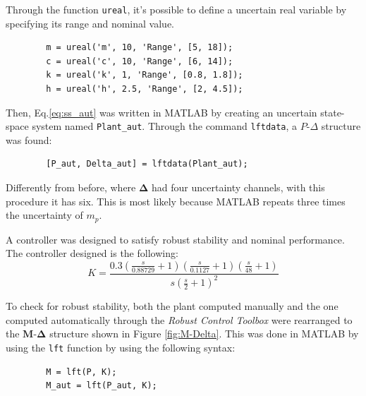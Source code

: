 \documentclass{scrreprt}
\begin{document}
Through the function \texttt{ureal}, it's possible to define a uncertain real variable by specifying its range and nominal value.

\begin{center}
    \begin{verbatim}
        m = ureal('m', 10, 'Range', [5, 18]);
        c = ureal('c', 10, 'Range', [6, 14]);
        k = ureal('k', 1, 'Range', [0.8, 1.8]);
        h = ureal('h', 2.5, 'Range', [2, 4.5]);
    \end{verbatim}
\end{center}

Then, Eq.\ref{eq:ss_aut} was written in MATLAB by creating an uncertain state-space system named \texttt{Plant\_aut}. Through the command \texttt{lftdata}, a $P$-$\Delta$ structure was found:

\begin{center}
    \begin{verbatim}
        [P_aut, Delta_aut] = lftdata(Plant_aut);
    \end{verbatim}
\end{center}

Differently from before, where $\boldsymbol{\Delta}$ had four uncertainty channels, with this procedure it has six. This is most likely because MATLAB repeats three times the uncertainty of $m_p$.

A controller was designed to satisfy robust stability and nominal performance. 
The controller designed is the following:
\begin{equation}
    K = \frac{0.3 \left( \frac{s}{0.88729} + 1 \right) \left( \frac{s}{0.1127} + 1 \right) \left( \frac{s}{48} + 1 \right)}{s \left( \frac{s}{2} + 1 \right)^2}
\end{equation}

To check for robust stability, both the plant computed manually and the one computed automatically through the \textit{Robust Control Toolbox}
were rearranged to the $\boldsymbol{M}$-$\boldsymbol{\Delta}$ structure shown in Figure \ref{fig:M-Delta}. This was done in MATLAB by using the \texttt{lft} function by using the following syntax:

\begin{center}
    \begin{verbatim}
        M = lft(P, K);
        M_aut = lft(P_aut, K);
    \end{verbatim}
\end{center}
\end{document}
